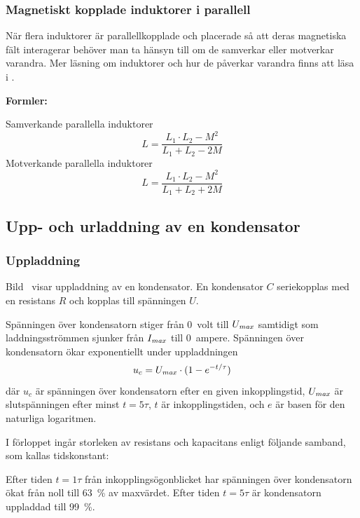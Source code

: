 \subsubsection{Magnetiskt kopplade induktorer i parallell}
När flera induktorer är parallellkopplade och placerade så att deras magnetiska
fält interagerar behöver man ta hänsyn till om de samverkar eller motverkar varandra.
Mer läsning om induktorer och hur de påverkar varandra finns att läsa i
\cite{letrafo}.

\textbf{Formler:}

Samverkande parallella induktorer
%
\[L = \frac{L_1 \cdot L_2 - M^2}{L_1 + L_2 - 2M}\]
%
Motverkande parallella induktorer
%
\[L = \frac{L_1 \cdot L_2 - M^2}{L_1 + L_2 + 2M}\]
%
\subsection{Upp- och urladdning av en kondensator}

\subsubsection{Uppladdning}


Bild~ visar uppladdning av en kondensator.
En kondensator \(C\) seriekopplas med en resistans \(R\)
och kopplas till spänningen \(U\).

Spänningen över kondensatorn stiger från 0~volt till \(U_{\it max}\) samtidigt
som laddningsströmmen sjunker från \(I_{\it max}\) till 0~ampere.
Spänningen över kondensatorn ökar exponentiellt under uppladdningen
%
\[u_c = U_{\it max} \cdot ( 1 - e^{-t/\tau} )\]
%
där \(u_c\) är spänningen över kondensatorn efter en given inkopplingstid, \(U_{\it max}\)
är slutspänningen efter minst \(t = 5\tau\), \(t\) är inkopplingstiden, och \(e\) är basen
för den naturliga logaritmen.

I förloppet ingår storleken av resistans och kapacitans enligt följande samband,
som kallas tidskonstant:


Efter tiden \(t = 1\tau\) från inkopplingsögonblicket har spänningen över
kondensatorn ökat från noll till \qty{63}{\percent} av maxvärdet.
Efter tiden \(t = 5\tau\) är kondensatorn uppladdad till \qty{99}{\percent}.

